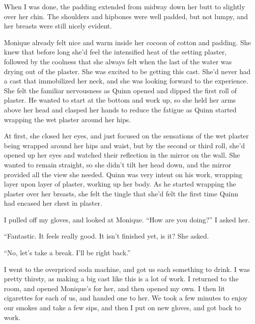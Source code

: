 When I was done, the padding extended from midway down her butt to slightly over her chin.
The shoulders and hipbones were well padded, but not lumpy, and her breasts were still nicely
evident.

\begin{thought}
Monique already felt nice and warm inside her cocoon of cotton and padding. She knew that
before long she'd feel the intensified heat of the setting plaster, followed by the coolness
that she always felt when the last of the water was drying out of the plaster. She was excited
to be getting this cast. She'd never had a cast that immobilized her neck, and she was looking
forward to the experience. She felt the familiar nervousness as Quinn opened and dipped the
first roll of plaster. He wanted to start at the bottom and work up, so she held her arms above
her head and clasped her hands to reduce the fatigue as Quinn started wrapping the wet plaster
around her hips.

At first, she closed her eyes, and just focused on the sensations of the wet plaster being
wrapped around her hips and waist, but by the second or third roll, she'd opened up her eyes and
watched their reflection in the mirror on the wall. She wanted to remain straight, so she didn't
tilt her head down, and the mirror provided all the view she needed. Quinn was very intent on
his work, wrapping layer upon layer of plaster, working up her body. As he started wrapping the
plaster over her breasts, she felt the tingle that she'd felt the first time Quinn had encased
her chest in plaster.
\end{thought}

I pulled off my gloves, and looked at Monique. ``How are you doing?'' I asked her.

``Fantastic. It feels really good. It isn't finished yet, is it? She asked.

``No, let's take a break. I'll be right back.''

I went to the overpriced soda machine, and got us each something to drink. I was pretty
thirsty, as making a big cast like this is a lot of work. I returned to the room, and opened
Monique's for her, and then opened my own. I then lit cigarettes for each of us, and handed one
to her. We took a few minutes to enjoy our smokes and take a few sips, and then I put on new
gloves, and got back to work.

